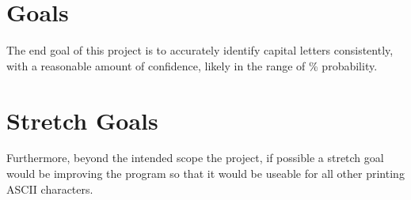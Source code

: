 \documentclass{article}
\begin{document}
\section{Goals}
The end goal of this project is to accurately identify capital letters consistently, with a reasonable 
amount of confidence, likely in the range of \% probability.
\section{Stretch Goals}
Furthermore, beyond the intended scope the project, if possible a stretch goal would be improving
the program so that it would be useable for all other printing ASCII characters.
\end{document}
